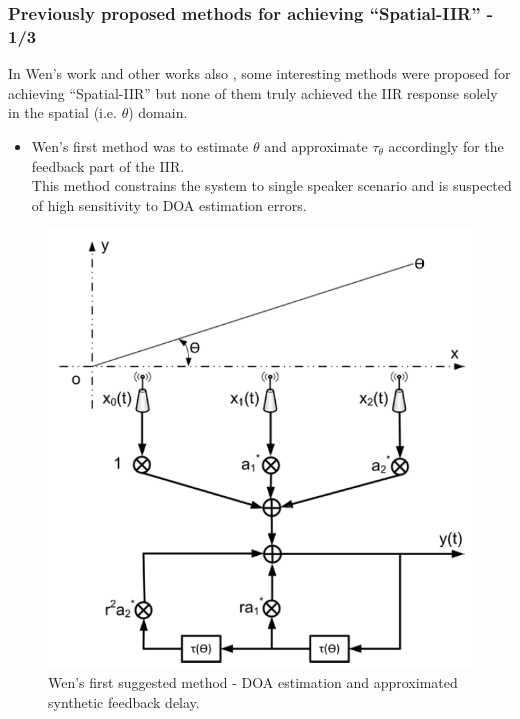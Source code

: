 \documentclass[10pt,pdflatex,headrule,landscape]{beamer}
\begin{document}
\begin{frame}
\frametitle{Previously proposed methods for achieving ``Spatial-IIR'' - 1/3}
In Wen's \cite{wen2013array} work and other works also \cite{Madanayake2008ABeamformer,Madanayake2009SystolicWDFs,Madanayake2008AFilters,Bruton2003Three-dimensionalBanks,Ward1986ABeamforming,Joshi2012SynthesisApplications}, some interesting methods were proposed for achieving ``Spatial-IIR'' but none of them truly achieved the IIR response solely in the spatial (i.e. $ \theta $) domain.
\\
\begin{minipage}{0.75\textwidth}
\begin{itemize}
\item
{
Wen's first method was to estimate $ \theta $ and approximate $ \tau_{\theta} $ accordingly for the feedback part of the IIR. 
\\
This method constrains the system to single speaker scenario and is suspected of high sensitivity to DOA estimation errors.
}
\end{itemize}
\end{minipage}
\begin{minipage}{0.24\textwidth}
\begin{figure}
\includegraphics[width=\textwidth]{Media/WenFirstSuggestedMethod.PNG}
\caption{Wen's first suggested method - DOA estimation and approximated synthetic feedback delay.}
\end{figure}
\end{minipage}
\end{frame}
\end{document}
